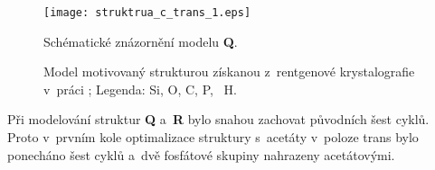 \documentclass[
digital, %
table,   %
lof,     %
lot,     %
oneside,
]{fithesis3}
\begin{document}
\begin{figure}\begin{center}\texttt{[image: struktrua\_c\_trans\_1.eps]}
\caption{Schématické znázornění modelu \textbf{Q}.}\label{schema_fosfat_cis}
\end{center}\end{figure}
\begin{figure}\begin{center}
\caption{Model motivovaný strukturou získanou z~rentgenové krystalografie v~práci \cite{C3NJ00721A};  Legenda:  Si,  O,  C,  P, ~H.}
\label{prehled_large}\end{center}
\end{figure}

Při modelování struktur \textbf{Q} a~\textbf{R} bylo snahou zachovat původních šest cyklů. Proto v~prvním kole optimalizace struktury s~acetáty v~poloze trans bylo ponecháno šest cyklů a~dvě fosfátové skupiny nahrazeny acetátovými.
\end{document}
